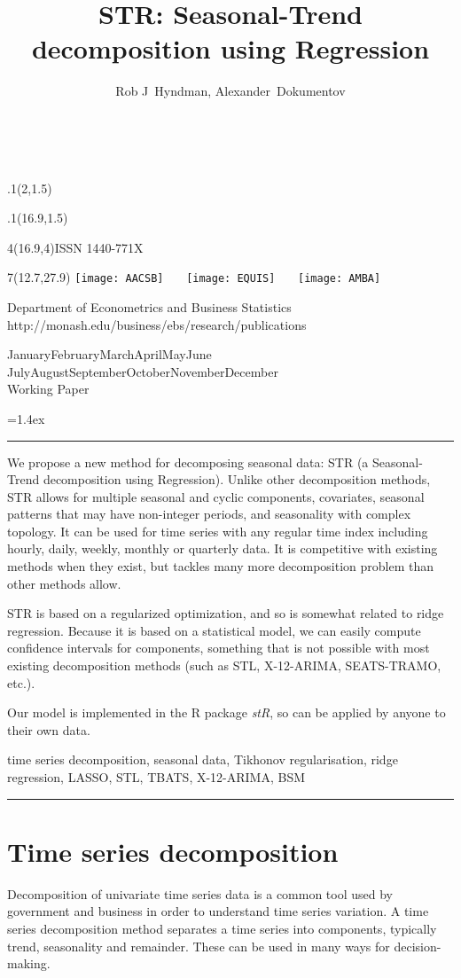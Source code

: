\documentclass[11pt,a4paper,]{article}
\title{STR: Seasonal-Trend decomposition using Regression}
\author{Rob J~Hyndman, Alexander~Dokumentov}
\date{\sf\Date~\Month~\Year}
\makeatletter
\def\Date{\number\day}
\def\Month{\ifcase\month\or
 January\or February\or March\or April\or May\or June\or
 July\or August\or September\or October\or November\or December\fi}
\def\Year{\number\year}
\def\showjel{{\large\textsf{\textbf{JEL classification:}}~\@jel}}
\def\cover{{\sffamily\setcounter{page}{0}
        \thispagestyle{empty}
        \placefig{2}{1.5}{width=5cm}{monash2}
        \placefig{16.9}{1.5}{width=2.1cm}{MBusSchool}
        \begin{textblock}{4}(16.9,4)ISSN 1440-771X\end{textblock}
        \begin{textblock}{7}(12.7,27.9)\hfill
        \texttt{[image: AACSB]}~~~
        \texttt{[image: EQUIS]}~~~
        \texttt{[image: AMBA]}
        \end{textblock}
        \vspace*{2cm}
        \begin{center}\Large
        Department of Econometrics and Business Statistics\\[.5cm]
        \footnotesize http://monash.edu/business/ebs/research/publications
        \end{center}\vspace{2cm}
        \begin{center}
        \fbox{\parbox{14cm}{\begin{onehalfspace}\centering\Huge\vspace*{0.3cm}
                \textsf{\textbf{\expandafter{\@title}}}\vspace{1cm}\par
                \LARGE\@author\end{onehalfspace}
        }}
        \end{center}
        \vfill
                \begin{center}\Large
                \Month~\Year\\[1cm]
                Working Paper \@wp
        \end{center}\vspace*{2cm}}}
\def\pageone{{\sffamily\setstretch{1}%
        \thispagestyle{empty}%
        \vbox to \textheight{%
        \raggedright\baselineskip=1.2cm
     {\fontsize{24.88}{30}\sffamily\textbf{\expandafter{\@title}}}
        \vspace{2cm}\par
        \hspace{1cm}\parbox{14cm}{\sffamily\large\@addresses}\vspace{1cm}\vfill
        \hspace{1cm}{\large\Date~\Month~\Year}\\[1cm]
        \hspace{1cm}\showjel\vss}}}
\def\blindtitle{{\sffamily
     \thispagestyle{plain}\raggedright\baselineskip=1.2cm
     {\fontsize{24.88}{30}\sffamily\textbf{\expandafter{\@title}}}\vspace{1cm}\par
        }}
\def\titlepage{{\cover\newpage\pageone\newpage\blindtitle}}
\let\maketitle\titlepage
\newenvironment{keywords}{\par\vspace{0.5cm}\noindent{\sffamily\textbf{Keywords:}}}{\vspace{0.25cm}\par\hrule\vspace{0.5cm}\par}
\renewenvironment{abstract}{\begin{minipage}{\textwidth}\parskip=1.4ex\noindent
\hrule\vspace{0.1cm}\par{\sffamily\textbf{\abstractname}}\newline}
  {\end{minipage}}
\def\placefig#1#2#3#4{\begin{textblock}{.1}(#1,#2)\rlap{\texttt{[image: \#4]}}\end{textblock}}
\makeatother
\begin{document}
\maketitle
\begin{abstract}
We propose a new method for decomposing seasonal data: STR (a Seasonal-Trend decomposition using Regression). Unlike other decomposition methods, STR allows for multiple seasonal and cyclic components, covariates, seasonal patterns that may have non-integer periods, and seasonality with complex topology. It can be used for time series with any regular time index including hourly, daily, weekly, monthly or quarterly data. It is competitive with existing methods when they exist, but tackles many more decomposition problem than other methods allow.

\par

STR is based on a regularized optimization, and so is somewhat related to ridge regression. Because it is based on a statistical model, we can easily compute confidence intervals for components, something that is not possible with most existing decomposition methods (such as STL, X-12-ARIMA, SEATS-TRAMO, etc.).

\par

Our model is implemented in the R package \emph{stR}, so can be applied by anyone to their own data.
\end{abstract}
\begin{keywords}
time series decomposition, seasonal data, Tikhonov regularisation, ridge regression, LASSO, STL, TBATS, X-12-ARIMA, BSM
\end{keywords}

\hypertarget{time-series-decomposition}{%
\section{Time series decomposition}\label{time-series-decomposition}}

Decomposition of univariate time series data is a common tool used by government and business in order to understand time series variation. A time series decomposition method separates a time series into components, typically trend, seasonality and remainder. These can be used in many ways for decision-making.
\end{document}
